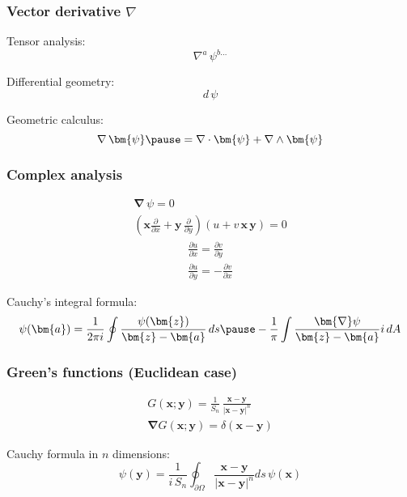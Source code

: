 \documentclass[12pt,xcolor={dvipsnames}]{beamer}
\renewcommand{\vec}{\bm}
\begin{document}
\begin{frame}
  \frametitle{Vector derivative $\nabla$}
  Tensor analysis:
  \begin{equation*}
    \nabla^{a}\, \psi^{b\ldots}
  \end{equation*}

  Differential geometry:
  \begin{equation*}
    d\, \psi
  \end{equation*}
  \pause

  Geometric calculus:
  \begin{equation*}
    \nabla\, \vec{\psi}
    \pause
    = \nabla \cdot \vec{\psi} + \nabla \wedge \vec{\psi}
  \end{equation*}
\end{frame}

\begin{frame}
  \frametitle{Complex analysis}
  \begin{gather*}
    \vec{\nabla}\, \psi = 0 \\ %
    \left( \vec{x} \frac{\partial}{\partial x} + \vec{y}\,
      \frac{\partial}{\partial y} \right) \left( u + v\, \vec{x}\,
      \vec{y} \right) = 0
  \end{gather*}
  \pause
  \begin{gather*}
    \frac{\partial u}{\partial x} = \frac{\partial v}{\partial y}\\
    \frac{\partial u}{\partial y} = -\frac{\partial v}{\partial x}
  \end{gather*}
  \pause

  Cauchy's integral formula:
  \begin{equation*}
    \psi(\vec{a}) = \frac{1}{2\pi i} \oint \frac{\psi(\vec{z})}
    {\vec{z}-\vec{a}}\, ds %
    \pause %
    - \frac{1}{\pi}\int\frac{\vec{\nabla}\psi}{\vec{z}-\vec{a}} i\, dA
  \end{equation*}
\end{frame}

\begin{frame}
  \frametitle{Green's functions (Euclidean case)}
  \begin{gather*}
    G(\vec{x};\vec{y}) = \frac{1}{S_{n}}\, \frac{\vec{x}-\vec{y}} {
      \lvert \vec{x}-\vec{y} \rvert^{n}}
    \\
    \vec{\nabla} G(\vec{x};\vec{y}) = \delta(\vec{x} - \vec{y})
  \end{gather*}

  Cauchy formula in $n$ dimensions:
  \begin{equation*}
    \psi(\vec{y}) = \frac{1} {i\, S_{n}} \oint_{\partial \Omega}
    \frac{\vec{x}-\vec{y}} {\lvert \vec{x}-\vec{y} \rvert^{n}} ds\,
    \psi(\vec{x})
  \end{equation*}
\end{frame}
\end{document}
